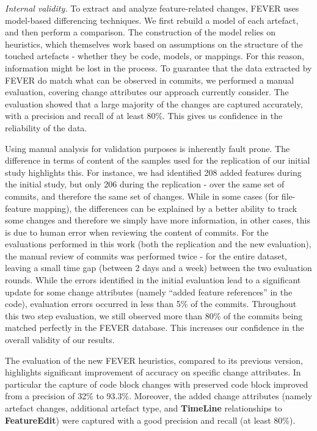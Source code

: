\textit{Internal validity.}
To extract and analyze feature-related changes, FEVER uses model-based differencing techniques.
We first rebuild a model of each artefact, and then perform a comparison.
The construction of the model relies on heuristics, which themselves work based on assumptions on the structure of the touched artefacts - 
whether they be code, models, or mappings.
For this reason, information might be lost in the process.
To guarantee that the data extracted by FEVER do match what can be observed in commits, 
we performed a manual evaluation, covering change attributes our approach currently consider.
The evaluation showed that a large majority of the changes are captured accurately, with a precision and recall of at least 80\%.
This gives us confidence in the reliability of the data.

Using manual analysis for validation purposes is inherently fault prone.
The difference in terms of content of the samples used for the replication of our initial study highlights this.
For instance, we had identified 208 added features during the initial study, but only 206 during the replication - over the same set of commits, and therefore the same set of changes.
While in some cases (\eg for file-feature mapping), the differences can be explained by a better ability to track some changes and therefore 
we simply have more information, in other cases, this is due to human error when reviewing the content of commits.
For the evaluations performed in this work (both the replication and the new evaluation), the manual review of commits was performed twice - for the entire dataset, leaving a small time gap (between 2 days and a week) between the two evaluation rounds.
While the errors identified in the initial evaluation lead to a significant update for some change attributes (namely ``added feature references'' in the code), evaluation errors occurred in less than 5\% of the commits.
Throughout this two step evaluation, we still observed more than 80\% of the commits being matched perfectly in the FEVER database. 
This increases our confidence in the overall validity of our results. 

The evaluation of the new FEVER heuristics, compared to its previous version, highlights significant improvement of accuracy on specific change attributes. 
In particular the capture of code block changes with preserved code block improved from  a precision of 32\% to 93.3\%. 
Moreover, the added change attributes (namely artefact changes, additional artefact type, and \textbf{TimeLine} relationships to \textbf{FeatureEdit}) were captured with a good precision and recall (at least 80\%).

